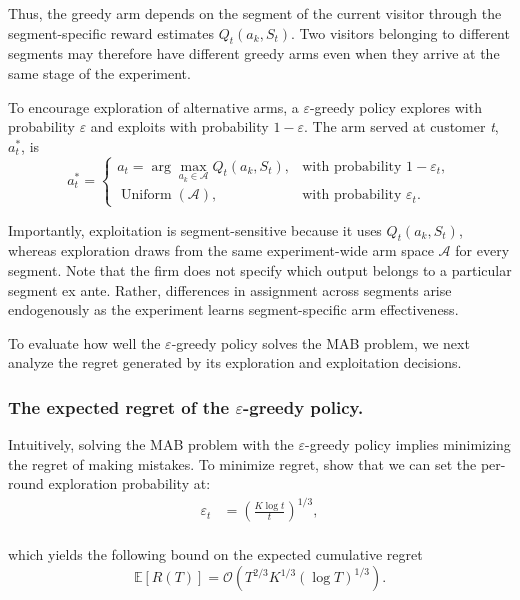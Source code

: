 \documentclass[mksc,nonblindrev]{informs3}
\begin{document}
Thus, the greedy arm depends on the segment of the current visitor through the
segment-specific reward estimates \(Q_t(a_k,S_t)\). Two visitors belonging to
different segments may therefore have different greedy arms even when they
arrive at the same stage of the experiment.

To encourage exploration of alternative arms, a $\varepsilon$-greedy policy explores with probability $\varepsilon$ and exploits with probability $1 - \varepsilon$. The arm served at customer \textit{t}, $a^{*}_t$, is
\begin{equation}
\label{eq:epsilon-greedy}
a_t^*
=
\begin{cases}
a_t
=
\displaystyle
\arg\max_{a_k\in\mathcal A}
Q_t(a_k,S_t),
&
\text{with probability }1-\varepsilon_t,
\\[8pt]
\operatorname{Uniform}(\mathcal A),
&
\text{with probability }\varepsilon_t.
\end{cases}
\end{equation}

Importantly, exploitation is segment-sensitive because it uses \(Q_t(a_k,S_t)\), whereas exploration draws from the same experiment-wide arm space \(\mathcal A\) for every segment. Note that the firm does not specify which output belongs to a particular segment ex ante. Rather, differences in assignment across segments arise endogenously as the experiment learns segment-specific arm effectiveness.

To evaluate how well the $\varepsilon$-greedy policy solves the MAB problem, we next analyze the regret generated by its exploration and exploitation decisions.

\subsubsection{The expected regret of the $\varepsilon$-greedy policy.} \label{sec:epsilon_greedy_regret}
Intuitively, solving the MAB problem with the $\varepsilon$-greedy policy implies minimizing the regret of making mistakes. To minimize regret, \cite{Panageas_Ghosal_Lin_2020} show that we can set the per-round exploration probability at: 
\begin{equation} \label{eq:opt_epsilon}
\begin{aligned}
\varepsilon_t  &= \left(\frac{K \log t}{t}\right)^{1/3},\\
\end{aligned}
\end{equation}

which yields the following bound on the expected cumulative regret
\begin{equation}
\label{eq:cumulative_regret}
\mathbb{E}\!\left[R(T)\right]
=
\mathcal{O}\!\left(
T^{2/3}K^{1/3}(\log T)^{1/3}
\right).
\end{equation}
\end{document}
